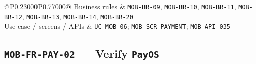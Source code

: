 \begin{longtable}{@{}P{0.23000\SRSWidth}P{0.77000\SRSWidth}@{}}
Business rules & \texttt{MOB-\allowbreak{}BR-\allowbreak{}09}, \texttt{MOB-\allowbreak{}BR-\allowbreak{}10}, \texttt{MOB-\allowbreak{}BR-\allowbreak{}11}, \texttt{MOB-\allowbreak{}BR-\allowbreak{}12}, \texttt{MOB-\allowbreak{}BR-\allowbreak{}13}, \texttt{MOB-\allowbreak{}BR-\allowbreak{}14}, \texttt{MOB-\allowbreak{}BR-\allowbreak{}20} \\[3pt]
Use case /\allowbreak{} screens /\allowbreak{} APIs & \texttt{UC-\allowbreak{}MOB-\allowbreak{}06}; \texttt{MOB-\allowbreak{}SCR-\allowbreak{}PAYMENT}; \texttt{MOB-\allowbreak{}API-\allowbreak{}035} \\[3pt]
\end{longtable}
\endgroup

\subsection{\texttt{MOB-\allowbreak{}FR-\allowbreak{}PAY-\allowbreak{}02} — Verify \texttt{Pay\allowbreak{}OS}}
\begingroup
\fontsize{9.5}{12}\selectfont
\setlength{\SRSWidth}{\dimexpr\linewidth-2\tabcolsep\relax}
